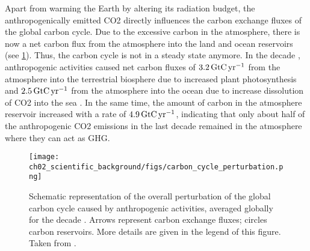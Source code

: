 Apart from warming the Earth by altering its radiation budget, the
anthropogenically emitted \ac{CO2} directly influences the carbon exchange
fluxes of the global carbon cycle. Due to the excessive carbon in the
atmosphere, there is now a net carbon flux from the atmosphere into the land
and ocean reservoirs (see \cref{fig:02:carbon_cycle_perturbation}). Thus, the
carbon cycle is not in a steady state anymore. In the decade
, anthropogenic activities caused net carbon fluxes of $3.2
\unit{\GtCyr{}}$ from the atmosphere into the terrestrial biosphere due to
increased plant photosynthesis and $2.5 \unit{\GtCyr{}}$ from the atmosphere
into the ocean due to increase dissolution of \ac{CO2} into the sea
\autocite{Friedlingstein2019}. In the same time, the amount of carbon in the
atmosphere reservoir increased with a rate of $4.9 \unit{\GtCyr{}}$, indicating
that only about half of the anthropogenic \ac{CO2} emissions in the last decade
remained in the atmosphere \autocite{Friedlingstein2019} where they can act as
\ac{GHG}.

\begin{figure}[t]
  \centering
  \texttt{[image: 
    ch02\_scientific\_background/figs/carbon\_cycle\_perturbation.png]}
  \caption{Schematic representation of the overall perturbation of the global
    carbon cycle caused by anthropogenic activities, averaged globally for the
    decade . Arrows represent carbon exchange fluxes; circles
    carbon reservoirs. More details are given in the legend of this figure.
    Taken from \textcite{Friedlingstein2019}.}
  \label{fig:02:carbon_cycle_perturbation}
\end{figure}

